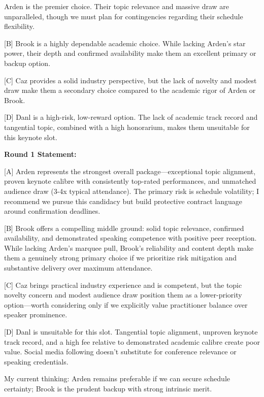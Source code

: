 \begin{tcolorbox}[mbox-neutral={agent\_4 -- discussion r1}]
[A] Arden is the premier choice. Their topic relevance and massive draw are unparalleled, though we must plan for contingencies regarding their schedule flexibility.

[B] Brook is a highly dependable academic choice. While lacking Arden's star power, their depth and confirmed availability make them an excellent primary or backup option.

[C] Caz provides a solid industry perspective, but the lack of novelty and modest draw make them a secondary choice compared to the academic rigor of Arden or Brook.

[D] Danl is a high-risk, low-reward option. The lack of academic track record and tangential topic, combined with a high honorarium, makes them unsuitable for this keynote slot.
\end{tcolorbox}

\begin{tcolorbox}[mbox-neutral={agent\_2 -- discussion r1}]
\textbf{Round 1 Statement:}

[A] Arden represents the strongest overall package---exceptional topic alignment, proven keynote calibre with consistently top-rated performances, and unmatched audience draw (3-4x typical attendance). The primary risk is schedule volatility; I recommend we pursue this candidacy but build protective contract language around confirmation deadlines.

[B] Brook offers a compelling middle ground: solid topic relevance, confirmed availability, and demonstrated speaking competence with positive peer reception. While lacking Arden's marquee pull, Brook's reliability and content depth make them a genuinely strong primary choice if we prioritize risk mitigation and substantive delivery over maximum attendance.

[C] Caz brings practical industry experience and is competent, but the topic novelty concern and modest audience draw position them as a lower-priority option---worth considering only if we explicitly value practitioner balance over speaker prominence.

[D] Danl is unsuitable for this slot. Tangential topic alignment, unproven keynote track record, and a high fee relative to demonstrated academic calibre create poor value. Social media following doesn't substitute for conference relevance or speaking credentials.

My current thinking: Arden remains preferable if we can secure schedule certainty; Brook is the prudent backup with strong intrinsic merit.
\end{tcolorbox}


